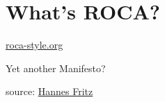 \documentclass{beamer}
\begin{document}
\section{What's ROCA?}

{
  \begin{frame}
    \vspace*{-2.5in}
    \href{http://roca-style.org}{roca-style.org}
  \end{frame}
}

\begin{frame}
  \Huge Yet another Manifesto?
\end{frame}

{
  \begin{frame}
    \vspace*{2.65in}
    \tiny source: \href{http://www.flickr.com/photos/sensorsicht/5338348801/}{Hannes Fritz}
  \end{frame}
}
\end{document}
